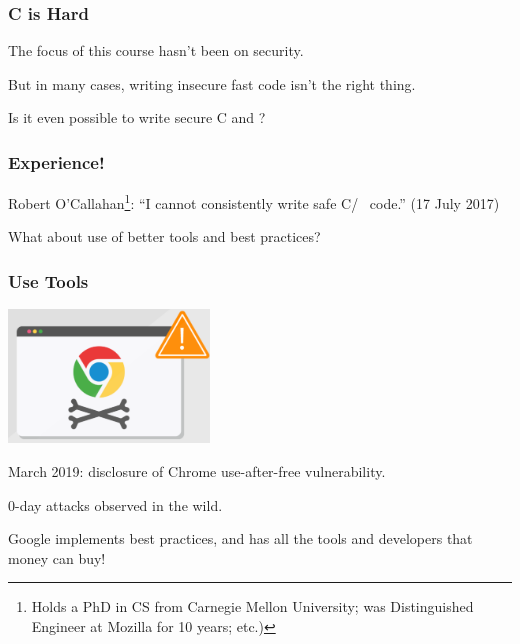 \begin{frame}
\frametitle{C is Hard}
The focus of this course hasn't been on security. 

But in many cases, writing insecure fast code isn't the right thing. 

Is it even possible to write secure C and \CPP?

\end{frame}


\begin{frame}
\frametitle{Experience!}

Robert O'Callahan\footnote{Holds a PhD in CS from Carnegie Mellon University; was Distinguished Engineer at Mozilla for 10 years; etc.)}: ``I cannot consistently write safe C/\CPP~ code.'' (17 July 2017)

What about use of better tools and best practices?

\end{frame}


\begin{frame}
\frametitle{Use Tools}

\begin{center}
	\includegraphics[width=0.4\textwidth]{images/chrome-vuln.png}
\end{center}

March 2019: disclosure of Chrome use-after-free vulnerability. 

0-day attacks observed in the wild.

Google implements best practices, and has all the tools and developers that
money can buy!

\end{frame}

